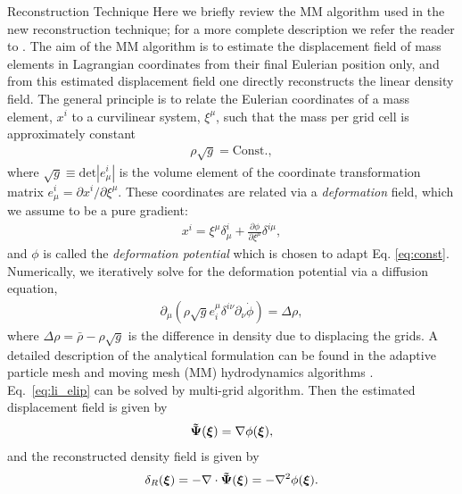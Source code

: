 \begin{section}{Reconstruction Technique}
  \label{sec:reconstruction}
  Here we briefly review the MM algorithm used in the new reconstruction technique; for a more
  complete description we refer the reader to \cite{bib:ZhuH2016}.  
  The aim of the MM algorithm is to estimate the displacement field of mass elements in 
  Lagrangian coordinates from their final Eulerian position only, and from this
  estimated displacement field one directly reconstructs the linear density field. The
  general principle is to relate the Eulerian coordinates of a mass element, $x^i$ to
  a curvilinear system, $\xi^\mu$, such that the mass
  per grid cell is approximately constant
  \begin{align}
   \label{eq:const}
    \rho \sqrt{g}=\mathrm{Const.},
  \end{align}
  where $\sqrt{g} \equiv \mathrm{det}\left| e^i_\mu\right|$ is the volume
  element of the coordinate transformation matrix $e^i_\mu = \partial x^i / \partial \xi ^ \mu$. 
  These coordinates are
  related via a {\it deformation} field, which we assume to be a pure
  gradient:
  \begin{align}
    x^i = \xi^\mu \delta^i_\mu + \frac{\partial \phi}{\partial
    \xi^\mu}\delta^{i\mu},
  \end{align}
  and $\phi$ is called the {\it deformation potential} which is chosen to adapt Eq. \ref{eq:const}.  
  Numerically, we iteratively solve for
  the deformation potential via a diffusion equation, 
  \begin{align}
    \label{eq:li_elip}
    \partial _\mu (\rho \sqrt{g} e^\mu _i \delta^{i\nu}
    \partial_\nu \dot{\phi})=\Delta \rho,
  \end{align}
  where $\Delta \rho = \bar{\rho}-\rho \sqrt{g}$ is the difference in density 
  due to displacing the grids. A detailed description 
  of the analytical formulation can be found in the adaptive
  particle mesh and moving mesh (MM) hydrodynamics algorithms \cite{bib:Pen1995,bib:Pen1998}.
  Eq.~\ref{eq:li_elip} can be solved by multi-grid
  algorithm\cite{bib:Pen1995,bib:Pen1998,bib:ZhuH2016}.
  Then the estimated displacement field is given by
  \begin{align}
   \label{eq:disp}
   \boldsymbol{\tilde{\Psi}}(\boldsymbol{\xi})=\nabla \phi(\boldsymbol{\xi}),
  \end{align}
  and the reconstructed density field is given by
  \begin{align}
   \label{eq:delta}
   \delta_R(\boldsymbol{\xi})=- \nabla \cdot \boldsymbol{\tilde{\Psi}}(\boldsymbol{\xi}) = - \nabla^2 \phi(\boldsymbol{\xi}). 
  \end{align}

\end{section}

